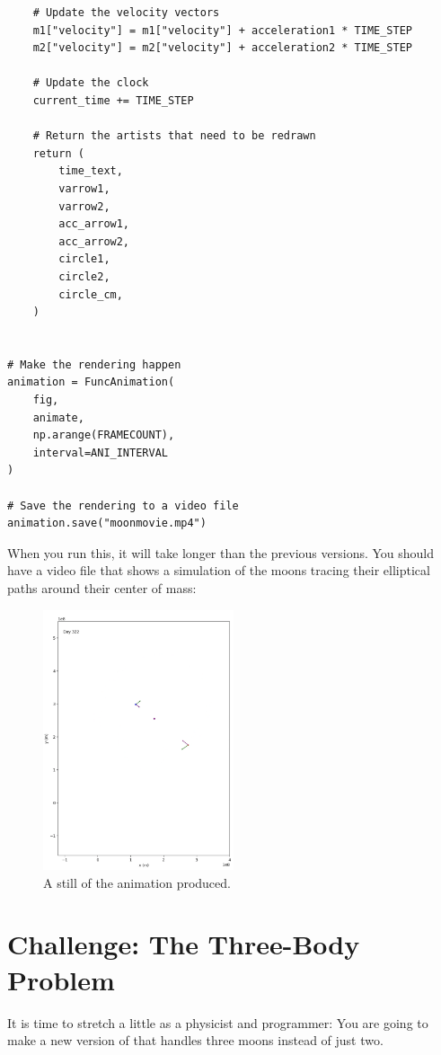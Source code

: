 \begin{verbatim}
    # Update the velocity vectors
    m1["velocity"] = m1["velocity"] + acceleration1 * TIME_STEP
    m2["velocity"] = m2["velocity"] + acceleration2 * TIME_STEP

    # Update the clock
    current_time += TIME_STEP

    # Return the artists that need to be redrawn
    return (
        time_text,
        varrow1,
        varrow2,
        acc_arrow1,
        acc_arrow2,
        circle1,
        circle2,
        circle_cm,
    )


# Make the rendering happen
animation = FuncAnimation(
    fig, 
    animate, 
    np.arange(FRAMECOUNT), 
    interval=ANI_INTERVAL
)

# Save the rendering to a video file
animation.save("moonmovie.mp4")
\end{verbatim}

When you run this,  it will take longer than the previous versions.  You should have a 
video file that shows a simulation of the moons tracing their elliptical paths around their
center of mass:
\begin{figure}[htbp]
    \centering
    \includegraphics[width=0.5\textwidth]{movie.png}
    \caption{A still of the animation produced.}
    \label{fig:movie}
\end{figure}

\section{Challenge: The Three-Body Problem}
It is time to stretch a little as a physicist and programmer:  You are going to make a new version of  that handles three moons instead of just two.

